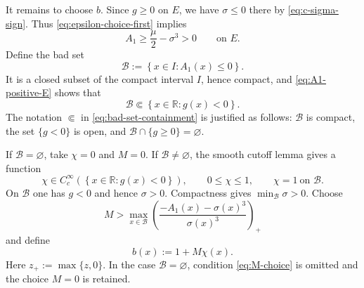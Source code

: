 \documentclass[11pt,reqno]{amsart}
\theoremstyle{definition}
\newcommand{\R}{\mathbb{R}}
\newcommand{\set}[1]{\left\{#1\right\}}
\begin{document}
It remains to choose $b$.  Since $g\ge0$ on $E$, we have
$\sigma\le0$ there by \cref{eq:c-sigma-sign}.  Thus
\cref{eq:epsilon-choice-first} implies
\begin{equation}
  A_1\ge\frac\mu2-\sigma^3>0
  \qquad\text{on }E.
  \label{eq:A1-positive-E}
\end{equation}
Define the bad set
\begin{equation}
  \mathcal B:=\set{x\in I:A_1(x)\le0}.
  \label{eq:bad-set}
\end{equation}
It is a closed subset of the compact interval $I$, hence compact, and
\cref{eq:A1-positive-E} shows that
\begin{equation}
  \mathcal B\Subset\set{x\in\R:g(x)<0}.
  \label{eq:bad-set-containment}
\end{equation}
The notation $\Subset$ in \cref{eq:bad-set-containment} is justified as
follows: $\mathcal B$ is compact, the set $\{g<0\}$ is open, and
$\mathcal B\cap\{g\ge0\}=\varnothing$.

If $\mathcal B=\varnothing$, take $\chi=0$ and $M=0$.  If
$\mathcal B\neq\varnothing$, the smooth cutoff lemma gives a function
\begin{equation}
  \chi\in C_c^\infty(\set{x\in\R:g(x)<0}),
  \qquad
  0\le\chi\le1,
  \qquad
  \chi=1\ \text{on }\mathcal B.
  \label{eq:chi}
\end{equation}
On $\mathcal B$ one has $g<0$ and hence $\sigma>0$.  Compactness gives
$\min_{\mathcal B}\sigma>0$.  Choose
\begin{equation}
  M>
  \max_{x\in\mathcal B}
  \left(\frac{-A_1(x)-\sigma(x)^3}{\sigma(x)^3}\right)_+
  \label{eq:M-choice}
\end{equation}
and define
\begin{equation}
  b(x):=1+M\chi(x).
  \label{eq:b-definition}
\end{equation}
Here $z_+:=\max\{z,0\}$.  In the case $\mathcal B=\varnothing$, condition
\cref{eq:M-choice} is omitted and the choice $M=0$ is retained.
\end{document}
